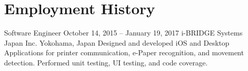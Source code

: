 \section*{Employment History}

\employment
	{Software Engineer}
	{October 14, 2015 -- January 19, 2017}
	{i-BRIDGE Systems Japan Inc.}
	{Yokohama, Japan}
	{Designed and developed iOS and Desktop Applications for printer communication, e-Paper recognition, and movement detection. Performed unit testing, UI testing, and code coverage.}

